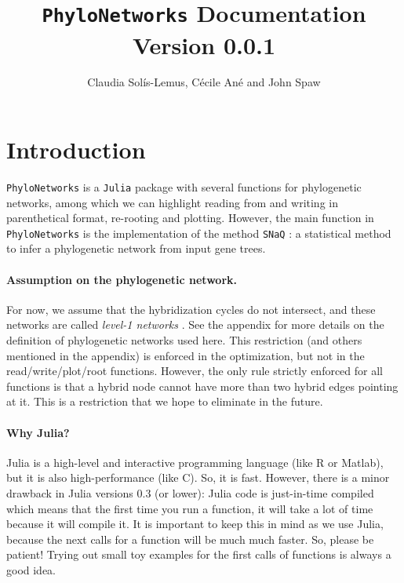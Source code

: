 \documentclass[12pt]{article}
\title{\texttt{PhyloNetworks} Documentation\\
 \large Version 0.0.1}
\author{Claudia Sol\'{i}s-Lemus, C\'{e}cile An\'{e} and John Spaw}
\begin{document}

\maketitle

\section{Introduction}
\texttt{PhyloNetworks} is a \texttt{Julia} package with several functions for
phylogenetic networks, among which we can highlight reading from and
writing in parenthetical format, re-rooting and plotting.
However, the main function in \texttt{PhyloNetworks} is the implementation of
the method \texttt{SNaQ} \citep{Solis-Lemus2015}: a statistical method to
infer a phylogenetic network from input gene trees.

\paragraph{Assumption on the phylogenetic network.} For now, we assume
that the hybridization cycles do not intersect, and these networks are
called \textit{level-1 networks} \citep{Huson2010}. See the appendix
for more details on the definition of phylogenetic networks used here.
This restriction (and others mentioned in the appendix) is enforced
in the optimization, but not in the read/write/plot/root
functions. However, the only rule strictly enforced for all functions
is that a hybrid node cannot have more than two hybrid edges pointing
at it. This is a restriction that we hope to eliminate in the future.

\paragraph{Why Julia?} Julia is a high-level and interactive
programming language (like R or Matlab), but it is also
high-performance (like C). So, it is fast. However, there is a minor
drawback in Julia versions 0.3 (or lower): Julia code is just-in-time
compiled which means that the first time you run a function, it will
take a lot of time because it will compile it. It is important to keep
this in mind as we use Julia, because the next calls for a function
will be much much faster. So, please be patient! Trying out small toy
examples for the first calls of functions is always a good idea.
\end{document}
